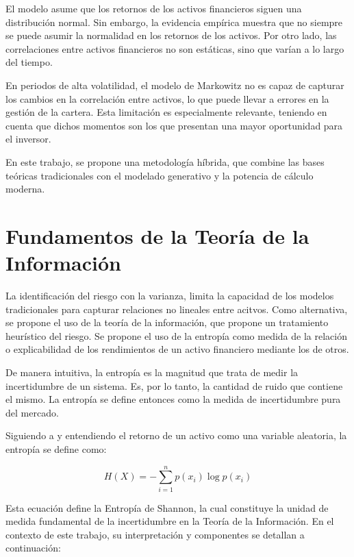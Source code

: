 El modelo asume que los retornos de los activos financieros siguen una distribución normal. Sin embargo, la evidencia empírica muestra que no siempre se puede asumir la normalidad en los retornos de los activos. Por otro lado, las correlaciones entre activos financieros no son estáticas, sino que varían a lo largo del tiempo.

En periodos de alta volatilidad, el modelo de Markowitz no es capaz de capturar los cambios en la correlación entre activos, lo que puede llevar a errores en la gestión de la cartera. Esta limitación es especialmente relevante, teniendo en cuenta que dichos momentos son los que presentan una mayor oportunidad para el inversor. 

En este trabajo, se propone una metodología híbrida, que combine las bases teóricas tradicionales con el modelado generativo y la potencia de cálculo moderna.

\section{Fundamentos de la Teoría de la Información}
La identificación del riesgo con la varianza, limita la capacidad de los modelos tradicionales para capturar relaciones no lineales entre acitvos. Como alternativa, se propone el uso de la teoría de la información, que propone un tratamiento heurístico del riesgo. Se propone el uso de la entropía como medida de la relación o explicabilidad de los rendimientos de un activo financiero mediante los de otros.

De manera intuitiva, la entropía es la magnitud que trata de medir la incertidumbre de un sistema. Es, por lo tanto, la cantidad de ruido que contiene el mismo. La entropía se define entonces como la medida de incertidumbre pura del mercado.

Siguiendo a \cite{cover2006elements} y entendiendo el retorno de un activo como una variable aleatoria, la entropía se define como:

\begin{equation}
H(X) = -\sum_{i=1}^n p(x_i) \log p(x_i)
\end{equation}

Esta ecuación define la Entropía de Shannon, la cual constituye la unidad de medida fundamental de la incertidumbre en la Teoría de la Información. En el contexto de este trabajo, su interpretación y componentes se detallan a continuación:

